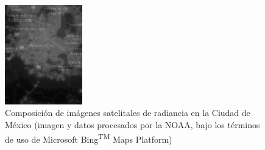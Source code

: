 \begin{figure}[htb]
  \centering
    \includegraphics[width=0.3\textwidth]{RadianceTrends}
  \caption{Composición de imágenes satelitales de radiancia en la Ciudad de México (imagen y datos procesados por la NOAA, bajo los términos de uso de Microsoft\textregistered \: Bing\textsuperscript{TM} \: Maps Platform)}
  \label{radiancetrends}
\end{figure}